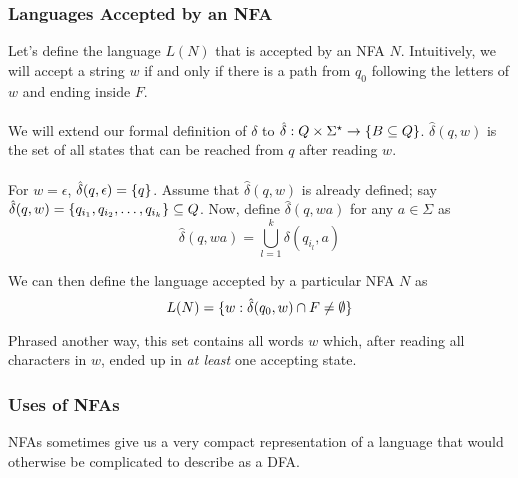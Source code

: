 \documentclass[]{article}
\DeclarePairedDelimiter{\set}{\lbrace}{\rbrace}
\theoremstyle{definition}
\begin{document}
        \subsubsection{Languages Accepted by an NFA}
          Let's define the language $L(N)$ that is accepted by an NFA $N$. Intuitively, we will accept a string $w$ if and only if there is a path from $q_0$ following the letters of $w$ and ending inside $F$.
          \\ \\
          We will extend our formal definition of $\delta$ to $\hat{\delta}: Q \times \Sigma^\star \to \set{ B \subseteq Q }$. $\hat{\delta}(q, w)$ is the set of all states that can be reached from $q$ after reading $w$.
          \\ \\
          For $w = \epsilon$, $\hat{\delta}(q, \epsilon) = \set{q}$. Assume that $\hat{\delta}(q, w)$ is already defined; say $\hat{\delta}(q, w) = \set{q_{i_1}, q_{i_2}, \ldots, q_{i_k}} \subseteq Q$. Now, define $\hat{\delta}(q, wa)$ for any $a \in \Sigma$ as
          $$
            \hat{\delta}(q, wa) = \bigcup_{l = 1}^{k} \delta(q_{i_l}, a)
          $$

          We can then define the language accepted by a particular NFA $N$ as
          $$
            L(N) = \set{ w : \hat{\delta}(q_0, w) \cap F \ne \emptyset }
          $$

          Phrased another way, this set contains all words $w$ which, after reading all characters in $w$, ended up in \emph{at least} one accepting state.

        \subsubsection{Uses of NFAs}
          NFAs sometimes give us a very compact representation of a language that would otherwise be complicated to describe as a DFA.
\end{document}
